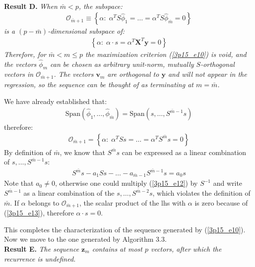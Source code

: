 \hspace{0.5cm}\\
\textbf{Result D.} \textit{When $\bar{m} < p$, the subspace:
    \begin{eqnarray*}
        \mathcal{O}_{\bar{m} + 1} \equiv \left\{ \alpha: \; \alpha^T S \hat{\phi} _{1} = \ldots =  \alpha^T S \hat{\phi} _{ \bar{m}} = 0 \right\}
    \end{eqnarray*} is a $(p - \bar{m})$-dimensional subspace of:
    \begin{eqnarray*}
        \left\{ \alpha: \; \alpha \cdot s = \alpha^T \mathbf{X}^T \mathbf{y} = 0\right\}
    \end{eqnarray*}
    Therefore, for $\bar{m} < m \leq p$ the maximization criterion (\ref{3p15_e10}) is void, and
    the vectors $\hat{\phi}_m$ can be chosen as arbitrary unit-norm, mutually $S$-orthogonal
    vectors in $\mathcal{O}_{\bar{m} + 1}$. The vectors $\mathbf{v}_m$ are orthogonal to $\mathbf{y}$ and will not appear in the regression, so the sequence can be thought of as terminating at $m = \bar{m}$.
}

\noindent We have already established that:
\begin{eqnarray*}
    \textrm{Span} \left( \hat{\phi}_1, \ldots, \hat{\phi}_{\bar{m}} \right) = 
    \textrm{Span} \left( s, \ldots, S^{\bar{m} - 1} s \right)
\end{eqnarray*}
therefore:
\begin{eqnarray} \label{3p15_e13}
\mathcal{O}_{\bar{m} + 1} = \left\{ \alpha: \; \alpha^T S s = \ldots = \alpha^T S^{\bar{m}} s = 0 \right\}	
\end{eqnarray}
By definition of $\bar{m}$, we know that $S^{\bar{m}} s$ can be expressed as a linear combination 
of $s, \ldots, S^{\bar{m} - 1}s$:
\begin{eqnarray} \label{3p15_e12}
S^{\bar{m}} s - a_1 S s - \ldots - a_{\bar{m} - 1} S^{\bar{m} - 1} s = a_0 s
\end{eqnarray}
Note that $a_0 \neq 0$, otherwise one could multiply (\ref{3p15_e12}) by $S^{-1}$ and write $S^{\bar{m} - 1}$ as a linear combination of the $s, \ldots, S^{\bar{m} - 2}s$, which
violates the definition of $\bar{m}$. If $\alpha$ belongs to $\mathcal{O}_{\bar{m} + 1}$,
the scalar product of the lhs with $\alpha$ is zero because of (\ref{3p15_e13}), therefore
$\alpha \cdot s = 0$.

This completes the characterization of the sequence generated by (\ref{3p15_e10}). Now we
move to the one generated by Algorithm 3.3.
\vspace{0.5cm}\\
\noindent \textbf{Result E.} \textit{The sequence $\mathbf{z}_m$ contains at most $p$ vectors, after
    which the recurrence is undefined.}

